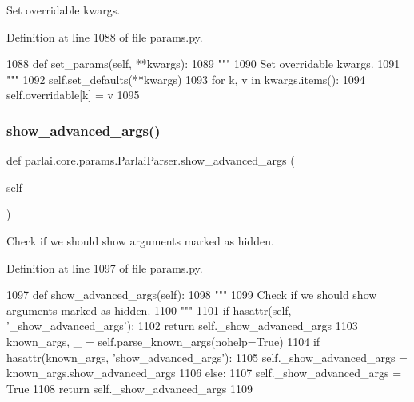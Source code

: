 \begin{DoxyVerb}Set overridable kwargs.
\end{DoxyVerb}
 

Definition at line 1088 of file params.\+py.


\begin{DoxyCode}
1088     \textcolor{keyword}{def }set\_params(self, **kwargs):
1089         \textcolor{stringliteral}{"""}
1090 \textcolor{stringliteral}{        Set overridable kwargs.}
1091 \textcolor{stringliteral}{        """}
1092         self.set\_defaults(**kwargs)
1093         \textcolor{keywordflow}{for} k, v \textcolor{keywordflow}{in} kwargs.items():
1094             self.overridable[k] = v
1095 
\end{DoxyCode}
\mbox{\label{classparlai_1_1core_1_1params_1_1ParlaiParser_a3a75bdeee002ed5a50706f1a6c9797c8}} 
\subsubsection{\texorpdfstring{show\+\_\+advanced\+\_\+args()}{show\_advanced\_args()}}
{\footnotesize\ttfamily def parlai.\+core.\+params.\+Parlai\+Parser.\+show\+\_\+advanced\+\_\+args (\begin{DoxyParamCaption}\item[{}]{self }\end{DoxyParamCaption})}

\begin{DoxyVerb}Check if we should show arguments marked as hidden.
\end{DoxyVerb}
 

Definition at line 1097 of file params.\+py.


\begin{DoxyCode}
1097     \textcolor{keyword}{def }show\_advanced\_args(self):
1098         \textcolor{stringliteral}{"""}
1099 \textcolor{stringliteral}{        Check if we should show arguments marked as hidden.}
1100 \textcolor{stringliteral}{        """}
1101         \textcolor{keywordflow}{if} hasattr(self, \textcolor{stringliteral}{'\_show\_advanced\_args'}):
1102             \textcolor{keywordflow}{return} self.\_show\_advanced\_args
1103         known\_args, \_ = self.parse\_known\_args(nohelp=\textcolor{keyword}{True})
1104         \textcolor{keywordflow}{if} hasattr(known\_args, \textcolor{stringliteral}{'show\_advanced\_args'}):
1105             self.\_show\_advanced\_args = known\_args.show\_advanced\_args
1106         \textcolor{keywordflow}{else}:
1107             self.\_show\_advanced\_args = \textcolor{keyword}{True}
1108         \textcolor{keywordflow}{return} self.\_show\_advanced\_args
1109 
\end{DoxyCode}


